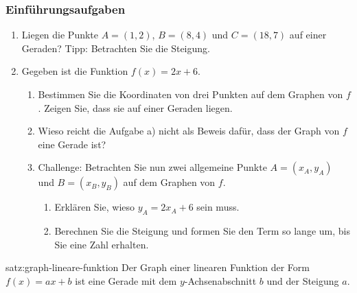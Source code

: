 \subsubsection{Einführungsaufgaben}
\begin{enumerate}
    \item Liegen die Punkte $A = (1,2)$, $B = (8,4)$ und $C = (18,7)$ auf einer Geraden? Tipp: Betrachten Sie die Steigung.
    \item Gegeben ist die Funktion $f(x) = 2x + 6$.
          \begin{enumerate}
              \item Bestimmen Sie die Koordinaten von drei Punkten auf dem Graphen von $f$. Zeigen Sie, dass sie auf einer Geraden liegen.
              \item Wieso reicht die Aufgabe a) nicht als Beweis dafür, dass der Graph von $f$ eine Gerade ist?
              \item Challenge: Betrachten Sie nun zwei allgemeine Punkte $A = (x_{A},y_{A})$ und $B = (x_{B},y_{B})$ auf dem Graphen von $f$.
                    \begin{enumerate}[label=\roman*)]
                        \item Erklären Sie, wieso $y_{A} = 2x_{A} + 6$ sein muss.
                        \item Berechnen Sie die Steigung und formen Sie den Term so lange um, bis Sie eine Zahl erhalten.
                    \end{enumerate}
          \end{enumerate}
\end{enumerate}

\begin{theo}{satz:graph-lineare-funktion}
    Der Graph einer linearen Funktion der Form $f(x) = ax + b$ ist eine Gerade mit dem $y$-Achsen\-abschnitt $b$ und der Steigung $a$.
    \begin{center}
    \end{center}
\end{theo}

